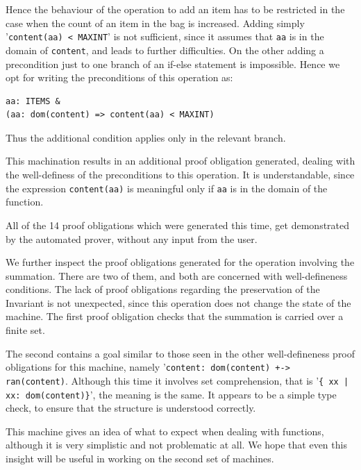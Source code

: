 \documentclass[11pt,journal]{IEEEtran}
\begin{document}
	Hence the behaviour of the operation to add an item has to be restricted in the case when the count of an item in the bag is increased. Adding simply '\texttt{content(aa) < MAXINT}' is not sufficient, since it assumes that \texttt{aa} is in the domain of \texttt{content}, and leads to further difficulties. On the other adding a precondition just to one branch of an if-else statement is impossible. Hence we opt for writing the preconditions of this operation as:
	\begin{lstlisting}
aa: ITEMS &
(aa: dom(content) => content(aa) < MAXINT)
	\end{lstlisting}
	Thus the additional condition applies only in the relevant branch.
	
	This machination results in an additional proof obligation generated, dealing with the well-definess of the preconditions to this operation. It is understandable, since the expression \texttt{content(aa)} is meaningful only if \texttt{aa} is in the domain of the function. 
	
	All of the 14 proof obligations which were generated this time, get demonstrated by the automated prover, without any input from the user.
	
	We further inspect the proof obligations generated for the operation involving the summation. There are two of them, and both are concerned with well-defineness conditions. The lack of proof obligations regarding the preservation of the Invariant is not unexpected, since this operation does not change the state of the machine. The first proof obligation checks that the summation is carried over a finite set. 
	
	The second contains a goal similar to those seen in the other well-defineness proof obligations for this machine, namely '\texttt{content: dom(content) +-> ran(content)}. Although this time it involves set comprehension, that is '\texttt{\{~xx | xx: dom(content)\}}', the meaning is the same. It appears to be a simple type check, to ensure that the structure is understood correctly.
	
	This machine gives an idea of what to expect when dealing with functions, although it is very simplistic and not problematic at all. We hope that even this insight will be useful in working on the second set of machines.
	
\end{document}
